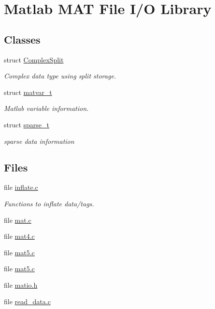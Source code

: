 \hypertarget{group__MAT}{\section{\-Matlab \-M\-A\-T \-File \-I/\-O \-Library}
\label{group__MAT}
}
\subsection*{\-Classes}
\begin{DoxyCompactItemize}
\item 
struct \hyperlink{structComplexSplit}{\-Complex\-Split}
\begin{DoxyCompactList}\small\item\em \-Complex data type using split storage. \end{DoxyCompactList}\item 
struct \hyperlink{structmatvar__t}{matvar\-\_\-t}
\begin{DoxyCompactList}\small\item\em \-Matlab variable information. \end{DoxyCompactList}\item 
struct \hyperlink{structsparse__t}{sparse\-\_\-t}
\begin{DoxyCompactList}\small\item\em sparse data information \end{DoxyCompactList}\end{DoxyCompactItemize}
\subsection*{\-Files}
\begin{DoxyCompactItemize}
\item 
file \hyperlink{inflate_8c}{inflate.\-c}
\begin{DoxyCompactList}\small\item\em \-Functions to inflate data/tags. \end{DoxyCompactList}\item 
file \hyperlink{mat_8c}{mat.\-c}
\item 
file \hyperlink{mat4_8c}{mat4.\-c}
\item 
file \hyperlink{mat5_8c}{mat5.\-c}
\item 
file \hyperlink{mat5_8c}{mat5.\-c}
\item 
file \hyperlink{matio_8h}{matio.\-h}
\item 
file \hyperlink{read__data_8c}{read\-\_\-data.\-c}
\end{DoxyCompactItemize}
